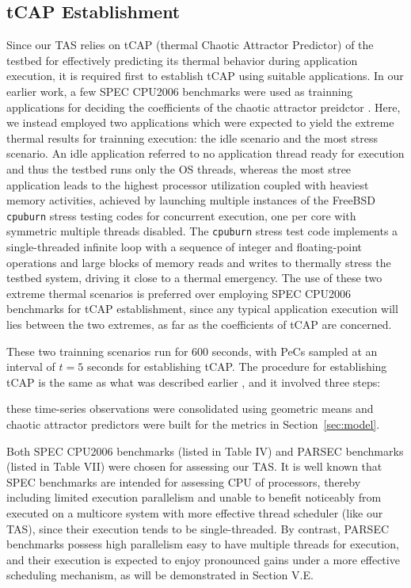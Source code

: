 \documentclass[times, 10pt,twocolumn]{IEEEtran}
\begin{document}
\subsection{tCAP Establishment}
\label{sec:callibration}
Since our TAS relies on tCAP (thermal Chaotic Attractor Predictor) of the testbed for effectively predicting its thermal behavior during application execution, 
it is required first to establish tCAP using suitable applications.
In our earlier work, a few SPEC CPU2006 benchmarks were used as trainning applications for deciding the coefficients of the chaotic attractor preidctor \cite{Lewis2010}.
Here, we instead employed two applications which were expected to yield the extreme thermal results for trainning execution:
the idle scenario and the most stress scenario.
An idle application referred to no application thread ready
for execution and thus the testbed runs only the OS threads,
whereas the most stree application leads to the
highest processor utilization coupled with heaviest memory
activities, achieved by launching multiple instances of the FreeBSD \texttt{cpuburn} stress testing codes for concurrent execution, one per core with symmetric multiple threads disabled.  The \texttt{cpuburn}
stress test code implements a single-threaded infinite loop with a sequence of integer and floating-point operations and large blocks of memory reads and writes to thermally stress the testbed system, driving it close to a thermal emergency.
The use of these two extreme thermal scenarios is preferred over employing SPEC CPU2006 benchmarks for tCAP establishment, since any typical application execution will lies between the two extremes, as far as the coefficients of tCAP are concerned.

These two trainning scenarios run for 600 seconds, with PeCs
sampled at an interval of $t=5$ seconds for establishing tCAP.
The procedure for establishing tCAP is the same as what was described earlier \cite{Lewis2010}, and it involved three steps:

these time-series observations were
consolidated using geometric means and chaotic attractor predictors were built for the metrics in Section~\ref{sec:model}.

Both SPEC CPU2006 benchmarks (listed in Table IV) and PARSEC benchmarks (listed in Table VII) were chosen for assessing our TAS.  It is well known that SPEC benchmarks are intended for assessing CPU of processors, thereby including limited execution parallelism and unable to benefit noticeably from   executed on a multicore system with more effective thread scheduler (like our TAS), since their execution tends to be single-threaded.  By contrast, PARSEC benchmarks possess high parallelism easy to have multiple threads for execution, and their execution is expected to enjoy pronounced gains under a more effective scheduling mechanism, as will be demonstrated in Section V.E.
\end{document}
